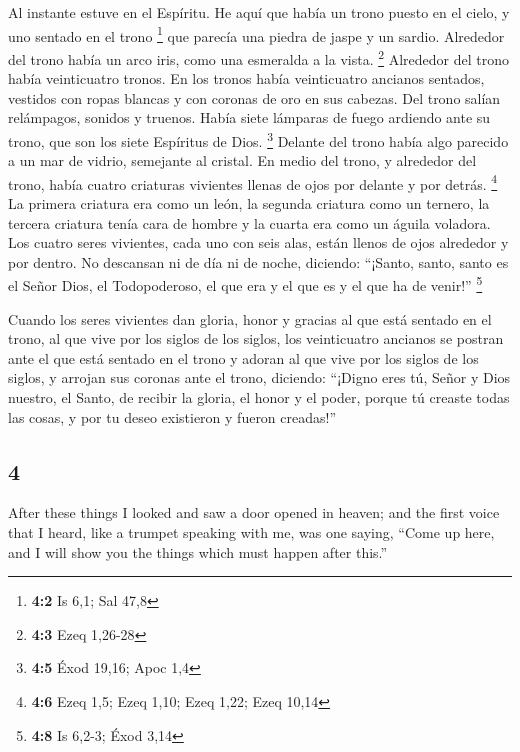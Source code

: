 \begin{paracol}{2}
 Al instante estuve en el Espíritu. He aquí que había un
trono puesto en el cielo, y uno sentado en el trono \footnote{\textbf{4:2}
  Is 6,1; Sal 47,8}  que parecía una piedra de jaspe y un
sardio. Alrededor del trono había un arco iris, como una esmeralda a la
vista. \footnote{\textbf{4:3} Ezeq 1,26-28}  Alrededor del
trono había veinticuatro tronos. En los tronos había veinticuatro
ancianos sentados, vestidos con ropas blancas y con coronas de oro en
sus cabezas.  Del trono salían relámpagos, sonidos y
truenos. Había siete lámparas de fuego ardiendo ante su trono, que son
los siete Espíritus de Dios. \footnote{\textbf{4:5} Éxod 19,16; Apoc 1,4}
 Delante del trono había algo parecido a un mar de vidrio,
semejante al cristal. En medio del trono, y alrededor del trono, había
cuatro criaturas vivientes llenas de ojos por delante y por detrás.
\footnote{\textbf{4:6} Ezeq 1,5; Ezeq 1,10; Ezeq 1,22; Ezeq 10,14}
 La primera criatura era como un león, la segunda criatura
como un ternero, la tercera criatura tenía cara de hombre y la cuarta
era como un águila voladora.  Los cuatro seres vivientes,
cada uno con seis alas, están llenos de ojos alrededor y por dentro. No
descansan ni de día ni de noche, diciendo: ``¡Santo, santo, santo es el
Señor Dios, el Todopoderoso, el que era y el que es y el que ha de
venir!'' \footnote{\textbf{4:8} Is 6,2-3; Éxod 3,14}

 Cuando los seres vivientes dan gloria, honor y gracias al
que está sentado en el trono, al que vive por los siglos de los siglos,
 los veinticuatro ancianos se postran ante el que está
sentado en el trono y adoran al que vive por los siglos de los siglos, y
arrojan sus coronas ante el trono, diciendo:  ``¡Digno
eres tú, Señor y Dios nuestro, el Santo, de recibir la gloria, el honor
y el poder, porque tú creaste todas las cosas, y por tu deseo existieron
y fueron creadas!''

\switchcolumn
\begin{otherlanguage}{english}

\hypertarget{section-7}{%
\section{4}\label{section-7}}

 After these things I looked and saw a door opened in
heaven; and the first voice that I heard, like a trumpet speaking with
me, was one saying, ``Come up here, and I will show you the things which
must happen after this.''


\end{otherlanguage}
\end{paracol}
